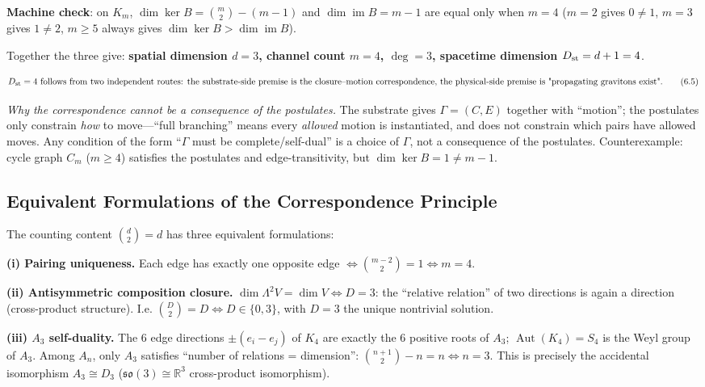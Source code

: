 \documentclass[
  11pt,
]{article}
\begin{document}
\textbf{Machine check}: on \(K_m\), \(\dim\ker B=\binom m2-(m-1)\) and
\(\dim\operatorname{im}B=m-1\) are equal only when \(m=4\) (\(m=2\)
gives \(0\ne1\), \(m=3\) gives \(1\ne2\), \(m\ge5\) always gives
\(\dim\ker B>\dim\operatorname{im}B\)).

Together the three give: \textbf{spatial dimension \(d=3\), channel
count \(m=4\), \(\deg=3\), spacetime dimension \(D_{\rm st}=d+1=4\)}.

\[
D_{\rm st}=4\text{ follows from two independent routes: the substrate-side premise is the closure--motion correspondence, the physical-side premise is "propagating gravitons exist".}
\tag{6.5}
\]

\emph{Why the correspondence cannot be a consequence of the postulates.}
The substrate gives \(\Gamma=(C,E)\) together with ``motion''; the
postulates only constrain \emph{how} to move---``full branching'' means
every \emph{allowed} motion is instantiated, and does not constrain
which pairs have allowed moves. Any condition of the form ``\(\Gamma\)
must be complete/self-dual'' is a choice of \(\Gamma\), not a
consequence of the postulates. Counterexample: cycle graph \(C_m\)
(\(m\ge4\)) satisfies the postulates and edge-transitivity, but
\(\dim\ker B=1\ne m-1\).

\subsection{Equivalent Formulations of the Correspondence
Principle}\label{equivalent-formulations-of-the-correspondence-principle}

The counting content \(\binom d2=d\) has three equivalent formulations:

\textbf{(i) Pairing uniqueness.} Each edge has exactly one opposite edge
\(\iff\binom{m-2}2=1\iff m=4\).

\textbf{(ii) Antisymmetric composition closure.}
\(\dim\Lambda^2V=\dim V\iff D=3\): the ``relative relation'' of two
directions is again a direction (cross-product structure). I.e.
\(\binom D2=D\iff D\in\{0,3\}\), with \(D=3\) the unique nontrivial
solution.

\textbf{(iii) \(A_3\) self-duality.} The 6 edge directions
\(\pm(e_i-e_j)\) of \(K_4\) are exactly the 6 positive roots of \(A_3\);
\(\operatorname{Aut}(K_4)=S_4\) is the Weyl group of \(A_3\). Among
\(A_n\), only \(A_3\) satisfies ``number of relations = dimension'':
\(\binom{n+1}2-n=n\iff n=3\). This is precisely the accidental
isomorphism \(A_3\cong D_3\) (\(\mathfrak{so}(3)\cong\mathbb R^3\)
cross-product isomorphism).
\end{document}
